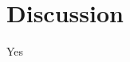 \section{Discussion}\label{sec:discussion}

Yes

\begin{comment}
  Edd's notes:

Related work:

Zoom exploit, hitting services running on the local network

https://developer.mozilla.org/en-US/docs/Web/Security/Same-origin_policy
"Cross-origin writes are typically allowed"

https://bugzilla.mozilla.org/show_bug.cgi?id=629094
https://www.grepular.com/Abusing_HTTP_Status_Codes_to_Expose_Private_Information
HTTP status code abuse to extract information cross-origin

https://bugzilla.mozilla.org/show_bug.cgi?id=354493
Zoom videoconferencing problem

https://bugzilla.mozilla.org/show_bug.cgi?id=371598
Drive-by pharming through browsers


Security constraints:

Defeating drive-by javascript:
unencrypted passwords prevents silent drive-by javascript, potentially
websites can still brute force or phish the password from you
some sort of CSRF token from my.starlink.com?

Defeating spoofing my.starlink.com:
Vulnerable: because it's using plaintext http
Reason: you can't make a request to an insecure origin from a secure origin (need citation)
use https
passwords prevent silently changing the dish

Attackers on local network:

HSTS could be used with TLS to secure this
CSRF tokens

%


\end{comment}
